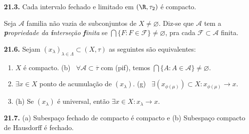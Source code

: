 \hypertarget{prop213}{}
\begin{proposition}
    \textbf{21.3.} Cada intervalo fechado e limitado em \((\R, \tau_2)\) é compacto. 
\end{proposition}

\begin{definition}
    Seja \(\mathcal{A}\) familia não vazia de subconjuntos de \(X \neq \varnothing\). Diz-se que \(\mathcal{A}\) tem a \emph{\textbf{p}ropriedade da \textbf{i}nterseção \textbf{f}inita} se \(\bigcap \{F: F  \in \mathcal{F}\} \neq \varnothing\), pra cada \(\mathcal{F}\subset \mathcal{A}\) finita. 
\end{definition}

\begin{theorem}
    \textbf{21.6.} Sejam \((x_\lambda)_{\lambda \in \Lambda} \subset (X, \tau)\) as seguintes são equivalentes: 
    \vspace{-0.3cm}
    \begin{enumerate}[label = (\alph*), left = 0.6cm]
        \item \(X\) é compacto. \hfill (b) \  \(\forall \mathcal{A}\subset \overline{\tau}\) com (pif), temos \(\displaystyle \bigcap \{A : A \in \mathcal{A}\} \neq \varnothing\). 
        \item[(f)] \(\exists x \in X\) ponto de acumulação de \((x_\lambda)\). \hfill (g) \ \(\exists (x_{\phi(\mu)})\subset X : x_{\phi(\mu)} \to x\). 
        \item[] \hspace{2cm}(h) Se \((x_\lambda)\) é universal, então \(\exists x \in X : x_\lambda \to x\).  
    \end{enumerate}
\end{theorem}
\vspace{-0.1cm}

\hypertarget{prop217}{}
\begin{proposition}
    \textbf{21.7.} (a) Subespaço fechado de compacto é compacto e (b) Subespaço compacto de Hausdorff é fechado. 
\end{proposition}


